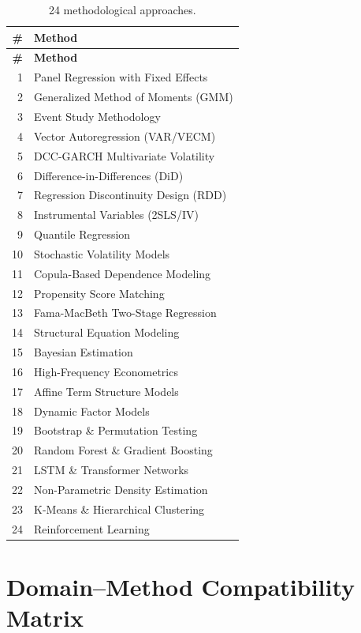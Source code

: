 \begin{longtable}{rl}
\caption{24 methodological approaches.} \label{tab:methods} \\
\toprule
\textbf{\#} & \textbf{Method} \\
\midrule
\endfirsthead
\toprule
\textbf{\#} & \textbf{Method} \\
\midrule
\endhead
1 & Panel Regression with Fixed Effects \\
2 & Generalized Method of Moments (GMM) \\
3 & Event Study Methodology \\
4 & Vector Autoregression (VAR/VECM) \\
5 & DCC-GARCH Multivariate Volatility \\
6 & Difference-in-Differences (DiD) \\
7 & Regression Discontinuity Design (RDD) \\
8 & Instrumental Variables (2SLS/IV) \\
9 & Quantile Regression \\
10 & Stochastic Volatility Models \\
11 & Copula-Based Dependence Modeling \\
12 & Propensity Score Matching \\
13 & Fama-MacBeth Two-Stage Regression \\
14 & Structural Equation Modeling \\
15 & Bayesian Estimation \\
16 & High-Frequency Econometrics \\
17 & Affine Term Structure Models \\
18 & Dynamic Factor Models \\
19 & Bootstrap \& Permutation Testing \\
20 & Random Forest \& Gradient Boosting \\
21 & LSTM \& Transformer Networks \\
22 & Non-Parametric Density Estimation \\
23 & K-Means \& Hierarchical Clustering \\
24 & Reinforcement Learning \\
\bottomrule
\end{longtable}

\section{Domain--Method Compatibility Matrix}
\label{sec:prompts:compat}

